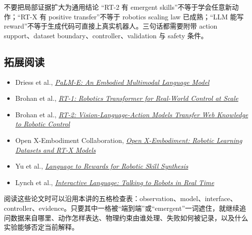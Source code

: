\begin{warningbox}{不要把局部证据扩大为通用结论}
“RT-2 有 emergent skills”不等于学会任意新动作；“RT-X 有 positive transfer”不等于 robotics scaling law 已成熟；“LLM 能写 reward”不等于生成代码可直接上真实机器人。三句话都需要附带 action support、dataset boundary、controller、validation 与 safety 条件。
\end{warningbox}

\subsection{拓展阅读}

\begin{itemize}
  \item Driess et al., \href{https://arxiv.org/abs/2303.03378}{\emph{PaLM-E: An Embodied Multimodal Language Model}}
  \item Brohan et al., \href{https://arxiv.org/abs/2212.06817}{\emph{RT-1: Robotics Transformer for Real-World Control at Scale}}
  \item Brohan et al., \href{https://arxiv.org/abs/2307.15818}{\emph{RT-2: Vision-Language-Action Models Transfer Web Knowledge to Robotic Control}}
  \item Open X-Embodiment Collaboration, \href{https://arxiv.org/abs/2310.08864}{\emph{Open X-Embodiment: Robotic Learning Datasets and RT-X Models}}
  \item Yu et al., \href{https://arxiv.org/abs/2306.08647}{\emph{Language to Rewards for Robotic Skill Synthesis}}
  \item Lynch et al., \href{https://arxiv.org/abs/2206.04717}{\emph{Interactive Language: Talking to Robots in Real Time}}
\end{itemize}

阅读这些论文时可以沿用本讲的五格检查表：observation、model、interface、controller、evidence。只要其中一格被“端到端”或“emergent”一词遮住，就继续追问数据来自哪里、动作怎样表达、物理约束由谁处理、失败如何被记录，以及什么实验能够否定当前解释。



